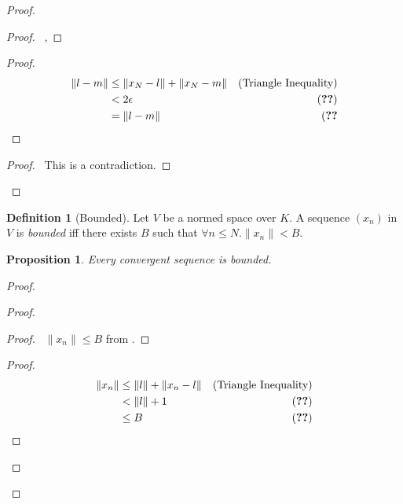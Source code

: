 \documentclass{book}
\let\qed\relax
\newtheorem{prop}[ax]{Proposition}
\theoremstyle{definition}
\newtheorem{df}[ax]{Definition}
\begin{document}
\begin{proof}
\pf
{}
\begin{proof}
	\pf\ , 
\end{proof}
\begin{proof}
	\pf
	\begin{align*}
		\|l - m\| & \leq \| x_N - l \| + \| x_N - m \| & (\text{Triangle Inequality}) \\
		& < 2 \epsilon & (\text{\stepref{5}}) \\
		& = \| l - m \| & (\text{\stepref{4}}
	\end{align*}
\end{proof}
\qedstep
\begin{proof}
	\pf\ This is a contradiction.
\end{proof}
\qed
\end{proof}

\begin{df}[Bounded]
Let $V$ be a normed space over $K$. A sequence $(x_n)$ in $V$ is \emph{bounded} iff there exists $B$ such that $\forall n \leq N. \|x_n\| < B$.
\end{df}

\begin{prop}
Every convergent sequence is bounded.
\end{prop}

\begin{proof}
\pf
{}
\begin{proof}
	\begin{proof}
		\pf\ $\| x_n \| \leq B$ from .
	\end{proof}
	\begin{proof}
		\pf
		\begin{align*}
			\|x_n\| & \leq \|l\| + \|x_n - l\| & (\text{Triangle Inequality}) \\
			& < \|l\| + 1 & (\text{\stepref{2}}) \\
			& \leq B & (\text{\stepref{3}})
		\end{align*}
	\end{proof}
\end{proof}
\qed
\end{proof}
\end{document}
